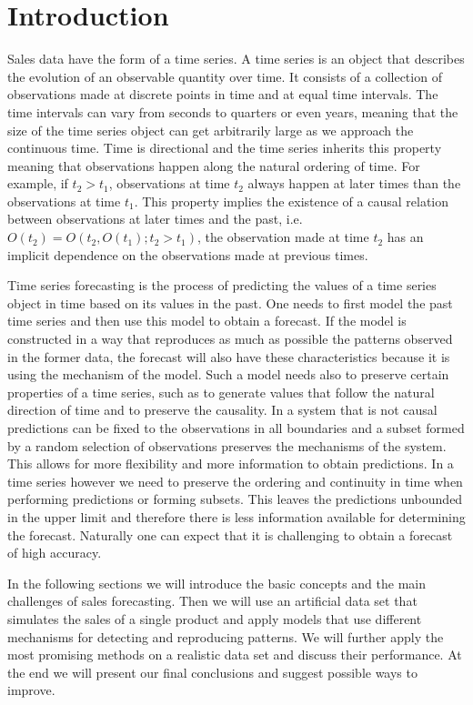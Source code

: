 \documentclass[12pt, letterpaper]{article}\usepackage[]{graphicx}\usepackage[]{color}
\begin{document}
\section{Introduction}

Sales data have the form of a time series. A time series is an object that describes the evolution of an observable quantity over time. It consists of a collection of observations made at discrete points in time and at equal time intervals. The time intervals can vary from seconds to quarters or even years, meaning that the size of the time series object can get arbitrarily large as we approach the continuous time. Time is directional and the time series inherits this property meaning that observations happen along the natural ordering of time. For example, if $t_2>t_1$, observations at time $t_2$ always happen at later times than the observations at time $t_1$. This property implies the existence of a causal relation between observations at later times and the past, i.e. $O(t_2) = O(t_2, O(t_1);t_2>t_1)$, the observation made at time $t_2$ has an implicit dependence on the observations made at previous times. 

Time series forecasting is the process of predicting the values of a time series object in time based on its values in the past. One needs to first model the past time series and then use this model to obtain a forecast. If the model is constructed in a way that reproduces as much as possible the patterns observed in the former data, the forecast will also have these characteristics because it is using the mechanism of the model. Such a model needs also to preserve certain properties of a time series, such as to generate values that follow the natural direction of time and to preserve the causality. In a system that is not causal predictions can be fixed to the observations in all boundaries and a subset formed by a random selection of observations preserves the mechanisms of the system. This allows for more flexibility and more information to obtain predictions. In a time series however we need to preserve the ordering and continuity in time when performing predictions or forming subsets. This leaves the predictions unbounded in the upper limit and therefore there is less information available for determining the forecast. Naturally one can expect that it is challenging to obtain a forecast of high accuracy. 

In the following sections we will introduce the basic concepts and the main challenges of sales forecasting. Then we will use an artificial data set that simulates the sales of a single product and apply models that use different mechanisms for detecting and reproducing patterns. We will further apply the most promising methods on a realistic data set and discuss their performance. At the end we will present our final conclusions and suggest possible ways to improve. 
\end{document}
